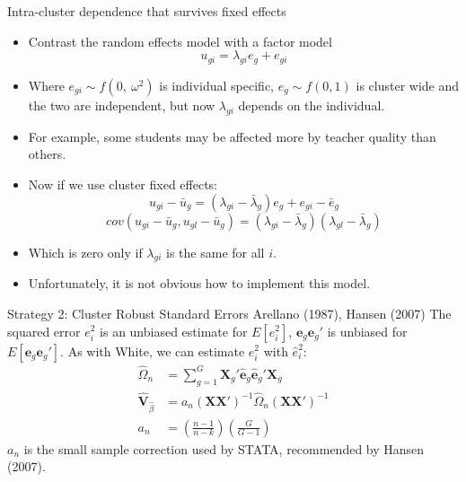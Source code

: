\documentclass[aspectratio=169, handout, t]{beamer}
\numberwithin{equation}{section}
\begin{document}
  
\begin{frame}{Intra-cluster dependence that survives fixed effects}
\begin{itemize}
\item Contrast the random effects model with a factor model
$$u_{gi}=\lambda_{gi} e_g+e_{gi}$$
\item Where $e_{gi}\sim f(0,\ \omega^2)$ is individual specific, $e_g\sim f(0,1)$ is cluster wide and the two are independent, but now $\lambda_{gi}$ depends on the individual. \pause
\item For example, some students may be affected more by teacher quality than others. \pause
\item Now if we use cluster fixed effects:
$$u_{gi}-\bar{u}_g=(\lambda_{gi}-\bar{\lambda}_g) e_g+e_{gi}-\bar{e}_g$$ \pause
$$cov(u_{gi}-\bar{u}_g, u_{gl}-\bar{u}_g)=(\lambda_{gi}-\bar{\lambda}_g)(\lambda_{gl}-\bar{\lambda}_g)$$ \pause
\item Which is zero only if $\lambda_{gi}$ is the same for all $i$. \pause
\item Unfortunately, it is not obvious how to implement this model.
\end{itemize}
\end{frame}
 
 
\begin{frame}{Strategy 2: Cluster Robust Standard Errors Arellano (1987), Hansen (2007)}
The squared error $e_i^2$ is an unbiased estimate for $E[e_i^2]$, $\bm{e}_g\bm{e}_g'$ is unbiased for $E[\bm{e}_g\bm{e}_g']$.  As with White, we can estimate $e_i^2$ with  $\hat{e}_i^2$:
\begin{align*}
\hat{\Omega}_n&=\sum_{g=1}^G\bm{X}_g'\bm{\hat{e}}_g\bm{\hat{e}}_g'\bm{X}_g\\
\hat{\bm{V}}_{\hat{\beta}}&=a_n\left(\bm{X}\bm{X}'\right)^{-1}\hat{\Omega}_n\left(\bm{X}\bm{X}'\right)^{-1}\\
a_n&=\left(\frac{n-1}{n-k}\right)\left(\frac{G}{G-1}\right)
\end{align*}
 $a_n$ is the small sample correction used by STATA, recommended by Hansen (2007).
 \end{frame}
\end{document}
